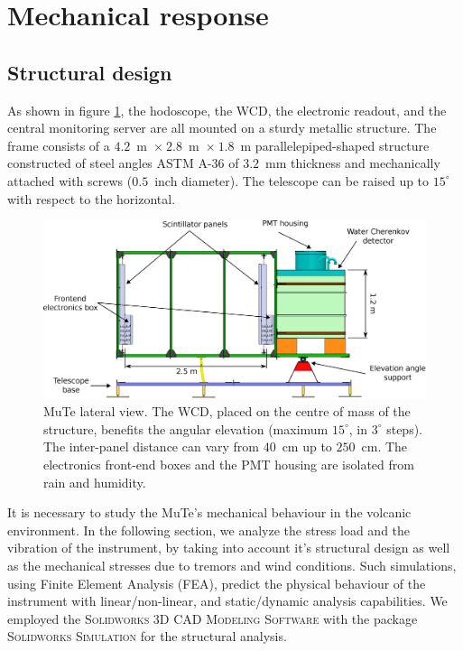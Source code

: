 \documentclass[letterpaper,11pt]{article}
\begin{document}
\section{Mechanical response}
\label{mechanical}
\subsection{Structural design}
As shown in figure \ref{fig:Structure}, the hodoscope, the WCD, the electronic readout, and the central monitoring server are all mounted on a sturdy metallic structure. The frame consists of a $4.2$~m~$\times~2.8$~m~$\times~1.8$~m parallelepiped-shaped structure constructed of steel angles ASTM A-36 of $3.2$~mm thickness and mechanically attached with screws ($0.5$~inch diameter). The telescope can be raised up to $15^{\circ}$ with respect to the horizontal. 


\begin{figure}[htb]
\centering
\includegraphics[width=1\columnwidth]{Figures/Detector.eps}
\caption{MuTe lateral view. The WCD, placed on the centre of mass of the structure, benefits the angular elevation (maximum $15^{\circ}$, in $3^{\circ}$ steps). The inter-panel distance can vary from  $40$~cm up to $250$~cm. The electronics front-end boxes and the PMT housing are isolated from rain and humidity.}
  \label{fig:Structure}
\end{figure}

 It is necessary to study the MuTe's mechanical behaviour in the volcanic environment. In the following section, we analyze the stress load and the vibration of the instrument, by taking into account it's structural design as well as the mechanical stresses due to tremors and wind conditions. Such simulations, using Finite Element Analysis (FEA), predict the physical behaviour of the instrument with linear/non-linear, and static/dynamic analysis capabilities. We employed the \textsc{Solidworks 3D CAD Modeling Software} with the package \textsc{Solidworks Simulation} for the structural analysis. 
\end{document}
